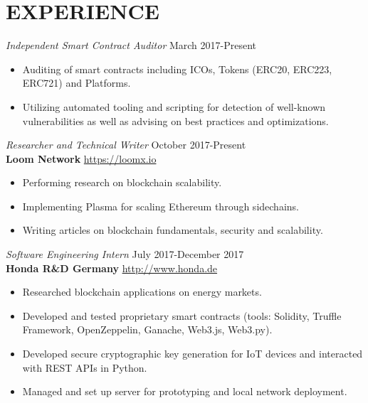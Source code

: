 \documentclass[margin, line]{res} %
\begin{document}
 
\section{EXPERIENCE}

{\sl Independent Smart Contract Auditor} \hfill March 2017-Present
\begin{itemize} \itemsep -2pt %
    \item Auditing of smart contracts including ICOs, Tokens (ERC20, ERC223, ERC721) and Platforms.
    \item Utilizing automated tooling and scripting for detection of well-known vulnerabilities as well as advising on best practices and optimizations.
\end{itemize}

{\sl Researcher and Technical Writer} \hfill October 2017-Present \\
\textbf{Loom Network} \hfill \url{https://loomx.io}
\begin{itemize} \itemsep -2pt %
    \item Performing research on blockchain scalability.
    \item Implementing Plasma for scaling Ethereum through sidechains.
    \item Writing articles on blockchain fundamentals, security and scalability.
\end{itemize}

{\sl Software Engineering Intern} \hfill July 2017-December 2017\\
\textbf{Honda R\&D Germany} \hfill \url{http://www.honda.de}
\begin{itemize} \itemsep -2pt %
    \item Researched blockchain applications on energy markets. 
    \item Developed and tested proprietary smart contracts (tools: Solidity, Truffle Framework, OpenZeppelin, Ganache, Web3.js, Web3.py).
    \item Developed secure cryptographic key generation for IoT devices and interacted with REST APIs in Python.
    \item Managed and set up server for prototyping and local network deployment.
\end{itemize}
\end{document}
